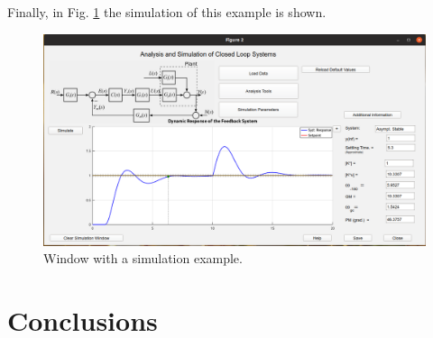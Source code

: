 Finally, in Fig. \ref{chp_lc_fig05_Gcl} the simulation of this example is shown.

\begin{figure}[H]
	\centering
	\includegraphics[scale=0.5]{./figuras/chapter_glc/fig05_ejemGcl.png}
	\caption{Window with a simulation example.}
	\label{chp_lc_fig05_Gcl}
\end{figure}


\section{Conclusions}

